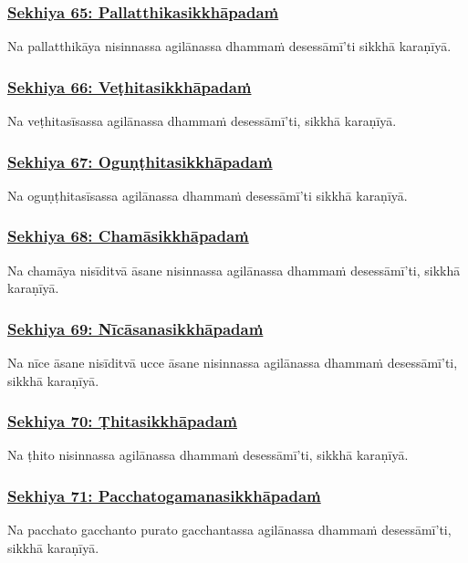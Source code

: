 \subsubsection*{\hyperref[training65]{Sekhiya 65: Pallatthikasikkhāpadaṁ}}
\label{sekh65}
Na pallatthikāya nisinnassa agilānassa dhammaṁ desessāmī'ti sikkhā karaṇīyā.

\subsubsection*{\hyperref[training66]{Sekhiya 66: Veṭhitasikkhāpadaṁ}}
\label{sekh66}
Na veṭhitasīsassa agilānassa dhammaṁ desessāmī'ti, sikkhā karaṇīyā.

\subsubsection*{\hyperref[training67]{Sekhiya 67: Oguṇṭhitasikkhāpadaṁ}}
\label{sekh67}
Na oguṇṭhitasīsassa agilānassa dhammaṁ desessāmī'ti sikkhā karaṇīyā.

\subsubsection*{\hyperref[training68]{Sekhiya 68: Chamāsikkhāpadaṁ}}
\label{sekh68}
Na chamāya nisīditvā āsane nisinnassa agilānassa dhammaṁ desessāmī'ti, sikkhā karaṇīyā.

\subsubsection*{\hyperref[training69]{Sekhiya 69: Nīcāsanasikkhāpadaṁ}}
\label{sekh69}
Na nīce āsane nisīditvā ucce āsane nisinnassa agilānassa dhammaṁ desessāmī'ti, sikkhā karaṇīyā.

\subsubsection*{\hyperref[training70]{Sekhiya 70: Ṭhitasikkhāpadaṁ}}
\label{sekh70}
Na ṭhito nisinnassa agilānassa dhammaṁ desessāmī'ti, sikkhā karaṇīyā.

\subsubsection*{\hyperref[training71]{Sekhiya 71: Pacchatogamanasikkhāpadaṁ}}
\label{sekh71}
Na pacchato gacchanto purato gacchantassa agilānassa dhammaṁ desessāmī'ti, sikkhā karaṇīyā.

